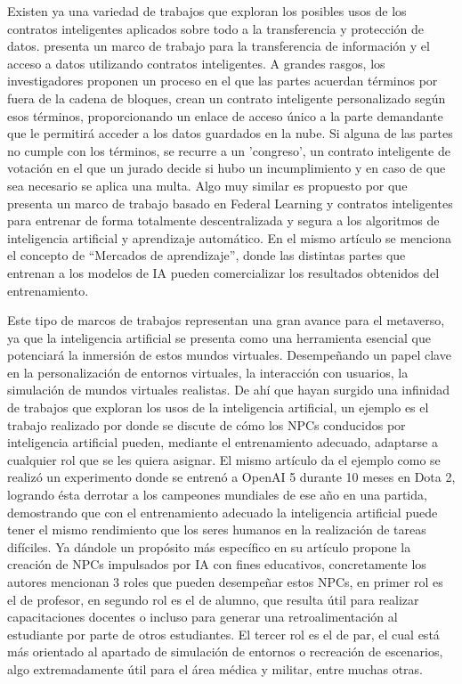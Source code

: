 \documentclass[a4paper,10pt]{article}
\begin{document}
	Existen ya una variedad de trabajos que exploran los posibles usos de los contratos inteligentes aplicados sobre todo a la transferencia y protección de datos. \textcite{liu2018enforceable} presenta un marco de trabajo para la transferencia de información y el acceso a datos utilizando contratos inteligentes. A grandes rasgos, los investigadores proponen un proceso en el que las partes acuerdan términos por fuera de la cadena de bloques, crean un contrato inteligente personalizado según esos términos, proporcionando un enlace de acceso único a la parte demandante que le permitirá acceder a los datos guardados en la nube. Si alguna de las partes no cumple con los términos, se recurre a un 'congreso', un contrato inteligente de votación en el que un jurado decide si hubo un incumplimiento y en caso de que sea necesario se aplica una multa. Algo muy similar es propuesto por \textcite{ouyang2020learning} que presenta un marco de trabajo basado en Federal Learning y contratos inteligentes para entrenar de forma totalmente descentralizada y segura a los algoritmos de inteligencia artificial y aprendizaje automático. En el mismo artículo se menciona el concepto de “Mercados de aprendizaje”, donde las distintas partes que entrenan a los modelos de IA pueden comercializar los resultados obtenidos del entrenamiento.
	
	Este tipo de marcos de trabajos representan una gran avance para el metaverso, ya que la inteligencia artificial se presenta como una herramienta esencial que potenciará la inmersión de estos mundos virtuales. Desempeñando un papel clave en la personalización de entornos virtuales, la interacción con usuarios, la simulación de mundos virtuales realistas. De ahí que hayan surgido una infinidad de trabajos que exploran los usos de la inteligencia artificial, un ejemplo es el trabajo realizado por \textcite{yang2022fusing} donde se discute de cómo los NPCs conducidos por inteligencia artificial pueden, mediante el entrenamiento adecuado, adaptarse a cualquier rol que se les quiera asignar. El mismo artículo da el ejemplo como se realizó un experimento donde se entrenó a OpenAI 5 durante 10 meses en Dota 2, logrando ésta derrotar a los campeones mundiales de ese año en una partida, demostrando que con el entrenamiento adecuado la inteligencia artificial puede tener el mismo rendimiento que los seres humanos en la realización de tareas difíciles. Ya dándole un propósito más específico \textcite{hwang2022definition} en su artículo propone la creación de NPCs impulsados por IA con fines educativos, concretamente los autores mencionan 3 roles que pueden desempeñar estos NPCs, en primer rol es el de profesor, en segundo rol es el de alumno, que resulta útil para realizar capacitaciones docentes o incluso para generar una retroalimentación al estudiante por parte de otros estudiantes. El tercer rol es el de par, el cual está más orientado al apartado de simulación de entornos o recreación de escenarios, algo extremadamente útil para el área médica y militar, entre muchas otras.
	
\end{document}
